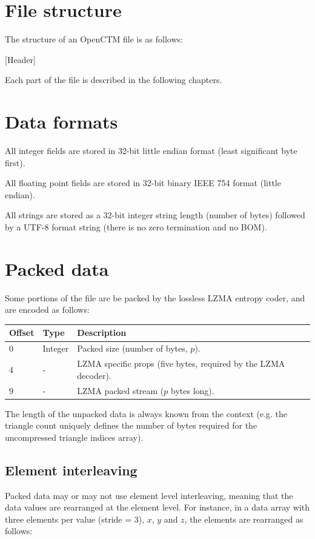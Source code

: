 \section{File structure}
The structure of an OpenCTM file is as follows:

[Header]

Each part of the file is described in the following chapters.

\section{Data formats}
All integer fields are stored in 32-bit little endian format (least significant
byte first).

All floating point fields are stored in 32-bit binary IEEE 754 format (little
endian).

All strings are stored as a 32-bit integer string length (number of bytes)
followed by a UTF-8 format string (there is no zero termination and no BOM).

\section{Packed data}
Some portions of the file are be packed by the lossless LZMA entropy coder,
and are encoded as follows:

\begin{tabular}{|l|l|l|}\hline
\textbf{Offset} & \textbf{Type} & \textbf{Description}\\ \hline
0 & Integer & Packed size (number of bytes, $p$).\\ \hline
4 & - & LZMA specific props (five bytes, required by the LZMA decoder).\\ \hline
9 & - & LZMA packed stream ($p$ bytes long).\\ \hline
\end{tabular}

The length of the unpacked data is always known from the context (e.g. the
triangle count uniquely defines the number of bytes required for the
uncompressed triangle indices array).

\subsection{Element interleaving}
Packed data may or may not use element level interleaving, meaning that the
data values are rearranged at the element level. For instance, in a data array
with three elements per value (stride = 3), $x$, $y$ and $z$, the elements are
rearranged as follows:

